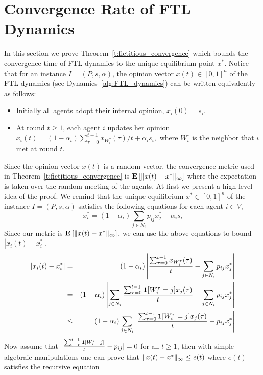 \section{Convergence Rate of FTL Dynamics}\label{s:fictitious_convergence}
In this section we prove Theorem~\ref{t:fictitious_convergence} which bounds
the convergence time of FTL dynamics to the unique equilibrium point $x^*$.
Notice that for an instance $I=(P,s,\alpha)$, the opinion vector $x(t) \in [0,1]^n$
of the FTL dynamics (see Dynamics~\ref{alg:FTL_dynamics}) can be written
equivalently as follows:
\begin{itemize}
 \item Initially all agents adopt their internal opinion, $x_i(0)=s_i$.
 \item At round $t \geq 1$, each agent $i$ updates her opinion
 \(
x_i(t)=(1-\alpha_i)\sum_{\tau=0}^{t-1} x_{W_i^\tau}(\tau)/t+ \alpha_i s_i,
\)
where $W_i^\tau$ is the neighbor that $i$ met at round $t$.
\end{itemize}
Since the opinion vector $x(t)$ is a random vector,
the convergence metric used in Theorem~\ref{t:fictitious_convergence} is
$\bm{\mathrm{E}}_{} \left[ \| x(t) - x^* \|_{\infty} \right]$ where the expectation is taken
over the random meeting of the agents.
%
%
At first we present a high level idea of the proof.
We remind that the unique equilibrium $x^* \in [0,1]^n$ of the
instance $I=(P,s,\alpha)$ satisfies the following equations
for each agent $i \in V$,
\[x_i^*= (1-\alpha_i)\sum_{j \in N_i}p_{ij}x_j^* + \alpha_is_i\]
Since our metric is $\bm{\mathrm{E}}_{} \left[ \| x(t)-x^* \|_{\infty} \right]$, we
can use the above equations to bound $|x_i(t)-x_i^*|$.
\begin{eqnarray*}
 |x_i(t)-x_i^*|
 &=& (1-\alpha_i)\left|\frac{\sum_{\tau=0}^{t-1} x_{W_i^\tau}(\tau)}{t}
 - \sum_{j \in N_i} p_{ij}x_j^*\right|\\
 &=& (1-\alpha_i)\left|\sum_{j \in N_i}\frac{\sum_{\tau=0}^{t-1} \bm{1}{\left[W_i^\tau=j\right]}x_j(\tau)}{t}-\sum_{j \in N_i} p_{ij}x_j^*\right|\\
 &\leq& (1-\alpha_i)\sum_{j \in N_i}\left|\frac{\sum_{\tau=0}^{t-1} \bm{1}{\left[W_i^\tau=j\right]}x_j(\tau)}{t}- p_{ij}x_j^*\right|
\end{eqnarray*}
Now assume that $|\frac{\sum_{\tau=0}^{t-1} \bm{1}{\left[W_i^{\tau}=j\right]}}{t}- p_{ij}| = 0$
for all $t\geq 1$, then with simple algebraic manipulations
one can prove that $\| x(t)-x^* \|_{\infty} \leq e(t)$ where $e(t)$
satisfies the recursive equation
